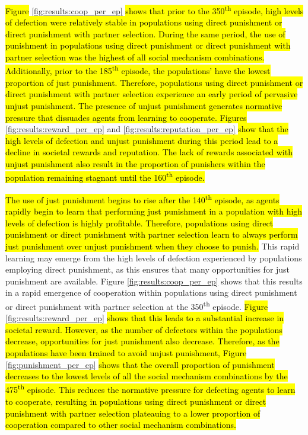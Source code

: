 \documentclass[sn-aps,numbered]{sn-jnl}%
\theoremstyle{thmstyleone}%
\theoremstyle{thmstyletwo}%
\theoremstyle{thmstylethree}%
\begin{document}
\hl{Figure} \ref{fig:results:coop_per_ep} \hl{shows that prior to the 350\textsuperscript{th} episode, high levels of defection were relatively stable in populations using direct punishment or direct punishment with partner selection. During the same period, the use of punishment in populations using direct punishment or direct punishment with partner selection was the highest of all social mechanism combinations. Additionally, prior to the 185\textsuperscript{th} episode, the populations' have the lowest proportion of just punishment. Therefore, populations using direct punishment or direct punishment with partner selection experience an early period of pervasive unjust punishment. The presence of unjust punishment generates normative pressure that dissuades agents from learning to cooperate. Figures} \ref{fig:results:reward_per_ep} and \ref{fig:results:reputation_per_ep} \hl{show that the high levels of defection and unjust punishment during this period lead to a decline in societal rewards and reputation. The lack of rewards associated with unjust punishment also result in the proportion of punishers within the population remaining stagnant until the 160\textsuperscript{th} episode.}

\hl{The use of just punishment begins to rise after the 140\textsuperscript{th} episode, as agents rapidly begin to learn that performing just punishment in a population with high levels of defection is highly profitable. Therefore, populations using direct punishment or direct punishment with partner selection learn to always perform just punishment over unjust punishment when they choose to punish.} This rapid learning may emerge from the high levels of defection experienced by populations employing direct punishment, as this ensures that many opportunities for just punishment are available. Figure \ref{fig:results:coop_per_ep} shows that this results in a rapid emergence of cooperation within populations using direct punishment or direct punishment with partner selection at the 350\textsuperscript{th} episode. \hl{Figure} \ref{fig:results:reward_per_ep} \hl{shows that this leads to a substantial increase in societal reward. However, as the number of defectors within the populations decrease, opportunities for just punishment also decrease. Therefore, as the populations have been trained to avoid unjust punishment, Figure} \ref{fig:punishment_per_ep} \hl{shows that the overall proportion of punishment decreases to the lowest levels of all the social mechanism combinations by the 475\textsuperscript{th} episode. This reduces the normative pressure for defecting agents to learn to cooperate, resulting in populations using direct punishment or direct punishment with partner selection plateauing to a lower proportion of cooperation compared to other social mechanism combinations.} 
\end{document}
